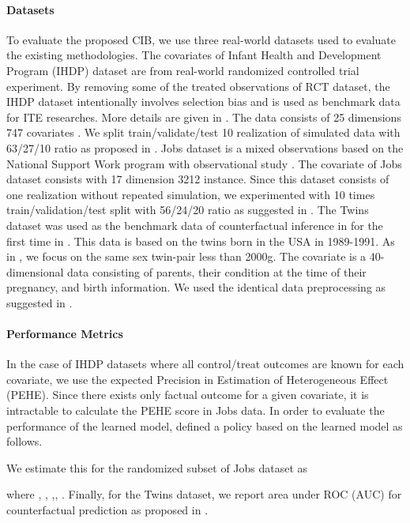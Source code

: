 \documentclass{article}
\begin{document}
\paragraph{Datasets} 
    To evaluate the proposed CIB, we use three real-world datasets used to evaluate the existing methodologies\cite{johansson16, Shalit17, Louizos17}. The covariates of Infant Health and Development Program (IHDP) dataset are from real-world randomized controlled trial experiment. By removing some of the treated observations of RCT dataset, the IHDP dataset intentionally involves selection bias and is used as benchmark data for ITE researches. More details are given in \cite{hill2011bayesian}. The data consists of 25 dimensions 747 covariates . We split train/validate/test 10 realization of simulated data with 63/27/10 ratio as proposed in \cite{yao2018}. Jobs dataset \cite{LaLonde1986} is a mixed observations based on the National Support Work program with observational study \cite{Smith2005}. The covariate of Jobs dataset consists with 17 dimension 3212 instance. Since this dataset consists of one realization without repeated simulation, we experimented with 10 times train/validation/test split with 56/24/20 ratio as suggested in \cite{Shalit17}. The Twins dataset was used as the benchmark data of counterfactual inference in for the first time in \cite{Louizos17}. This data is based on the twins born in the USA in 1989-1991. As in \cite{yao2018}, we focus on the same sex twin-pair less than 2000g. The covariate is a 40-dimensional data consisting of parents, their condition at the time of their pregnancy, and birth information. We used the identical data preprocessing as suggested in \cite{yao2018}.
    \paragraph{Performance Metrics}
    In the case of IHDP datasets where all control/treat outcomes are known for each covariate, we use the expected Precision in Estimation of Heterogeneous Effect (PEHE). Since there exists only factual outcome for a given covariate, it is intractable to calculate the PEHE score in Jobs data. In order to evaluate the performance of the learned model, \cite{Shalit17} defined a policy  based on the learned model  as follows.
    
    
    We estimate this for the randomized subset of Jobs dataset as
    
    where , , ,, .
    Finally, for the Twins dataset, we report area under ROC (AUC) for counterfactual prediction as proposed in \cite{Louizos17}.
    
\end{document}
